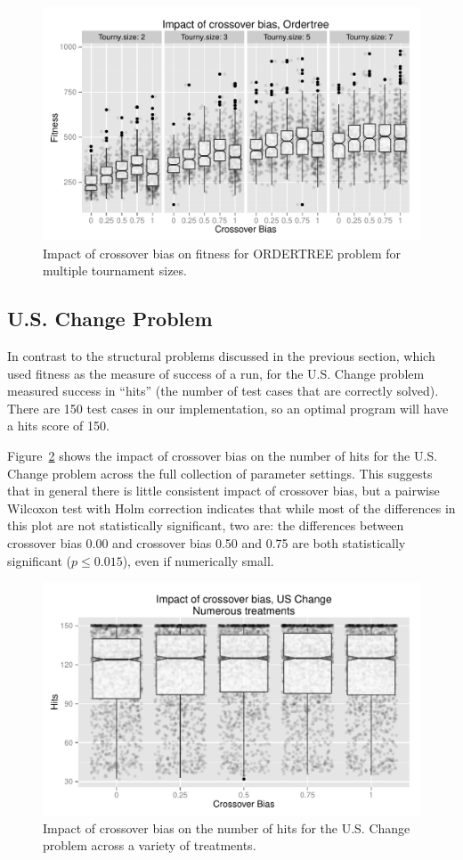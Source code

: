 \documentclass{sig-alternate}
\begin{document}
\begin{figure}
\centering
\includegraphics[width=0.45 \textwidth]{Plots/Ordertree_results_all_tournaments_Jan15.pdf}
\caption{Impact of crossover bias on fitness for ORDERTREE problem for multiple tournament sizes.}
\label{fig:Ordertree_results_all_tournaments_Jan15}
\end{figure}

%
%
%
%

\subsection{U.S. Change Problem}

In contrast to the structural problems discussed in the previous section, which used fitness as the measure of success
of a run, for the U.S. Change problem measured success in ``hits'' (the number of test cases that are correctly
solved). There are 150 test cases in our implementation, so an optimal program will have a hits score of 150.

Figure~\ref{fig:USChange_Hits} shows the impact of crossover bias on the number of hits for the U.S. Change problem
across the full collection of parameter settings. This suggests that in general there is little consistent impact of
crossover bias, but a pairwise Wilcoxon test with Holm correction indicates that while most of the differences in this
plot are not statistically significant, two are: the differences between crossover bias 0.00 and crossover bias 0.50 and
0.75 are both statistically significant ($p \leq 0.015$), even if numerically small.

\begin{figure}
\centering
\includegraphics[width=0.45 \textwidth]{Plots/US_change_hits.pdf}
\caption{Impact of crossover bias on the number of hits for the U.S. Change problem across a variety of treatments.}
\label{fig:USChange_Hits}
\end{figure}
\end{document}
